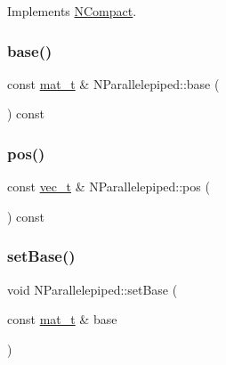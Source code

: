 Implements \mbox{\hyperlink{class_n_compact_a816bb4976567a7bfed57763ce717b685}{N\+Compact}}.

\mbox{\label{class_n_parallelepiped_a59a297106e5f9a9d8cc672dbe685eced}} 
\subsubsection{\texorpdfstring{base()}{base()}}
{\footnotesize\ttfamily const \mbox{\hyperlink{group___n_algebra_ga44dfb60c1e03b44e98a332fb2ae71947}{mat\+\_\+t}} \& N\+Parallelepiped\+::base (\begin{DoxyParamCaption}{ }\end{DoxyParamCaption}) const}

\mbox{\label{class_n_parallelepiped_a15e7d385482e105caad884697aa2a9ab}} 
\subsubsection{\texorpdfstring{pos()}{pos()}}
{\footnotesize\ttfamily const \mbox{\hyperlink{group___n_algebra_ga0a2cfc67e738a3d73e4f12098c4c07f6}{vec\+\_\+t}} \& N\+Parallelepiped\+::pos (\begin{DoxyParamCaption}{ }\end{DoxyParamCaption}) const}

\mbox{\label{class_n_parallelepiped_af50551bef2ecb0d6628a6668824bb2ac}} 
\subsubsection{\texorpdfstring{setBase()}{setBase()}}
{\footnotesize\ttfamily void N\+Parallelepiped\+::set\+Base (\begin{DoxyParamCaption}\item[{const \mbox{\hyperlink{group___n_algebra_ga44dfb60c1e03b44e98a332fb2ae71947}{mat\+\_\+t}} \&}]{base }\end{DoxyParamCaption})}

\mbox{\label{class_n_parallelepiped_a29f55165985609afbc16b91c4143771d}} 
